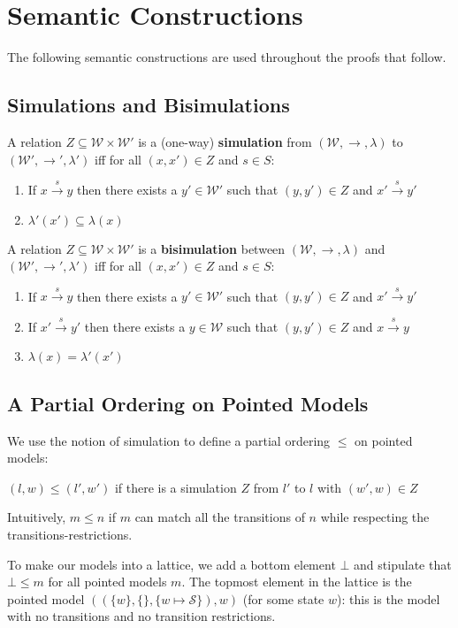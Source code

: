 \section{Semantic Constructions}
The following semantic constructions are used throughout the proofs that follow.
\subsection{Simulations and Bisimulations}

A relation $Z \subseteq \mathcal{W} \times \mathcal{W}'$ is a (one-way) {\bf simulation} from  $(\mathcal{W}, \rightarrow, \lambda)$ to $(\mathcal{W}', \rightarrow', \lambda')$ iff for all $(x,x') \in Z$ and $s \in S$:
\begin{enumerate}
\item
If $x \xrightarrow{s} y$ then there exists a $y' \in \mathcal{W}'$ such that $(y,y') \in Z$ and $x' \xrightarrow{s} y'$
\item
$\lambda'(x') \subseteq \lambda(x)$
\end{enumerate}
A relation $Z \subseteq \mathcal{W} \times \mathcal{W}'$ is a {\bf bisimulation} between  $(\mathcal{W}, \rightarrow, \lambda)$ and $(\mathcal{W}', \rightarrow', \lambda')$ iff for all $(x,x') \in Z$ and $s \in S$:
\begin{enumerate}
\item
If $x \xrightarrow{s} y$ then there exists a $y' \in \mathcal{W}'$ such that $(y,y') \in Z$ and $x' \xrightarrow{s} y'$
\item
If $x' \xrightarrow{s} y'$ then there exists a $y \in \mathcal{W}$ such that $(y,y') \in Z$ and $x \xrightarrow{s} y$
\item
$\lambda(x) = \lambda'(x')$
\end{enumerate}

\subsection{A Partial Ordering on Pointed Models}
We use the notion of simulation to define a partial ordering $\leq$ on pointed models:
\begin{definition}
$(l,w) \leq (l',w')$ if there is a simulation $Z$ from $l'$ to $l$ with $(w',w) \in Z$
\end{definition}
Intuitively, $m \leq n$ if $m$ can match all the transitions of $n$ while respecting the transitions-restrictions.

To make our models into a lattice, we add a bottom element $\bot$ and stipulate that $\bot \leq m$ for all pointed models $m$.
The topmost element in the lattice is the pointed model $( (\{w\}, \{\}, \{w \mapsto \mathcal{S}\}), w)$ (for some state $w$): this is the model with no transitions and no transition restrictions.

